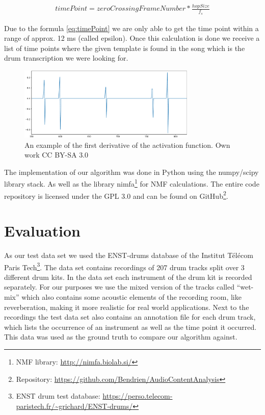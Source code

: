 \documentclass{article}
\begin{document}
\begin{align}
\label{eq:timePoint}
timePoint = zeroCrossingFrameNumber * \frac{hopSize}{f_s}
\end{align}

Due to the formula \ref{eq:timePoint} we are only able to get the time point within a range of approx. 12 ms (called epsilon).
Once this calculation is done we receive a list of time points where the given template is found in the song which is the drum transcription we were looking for.

\begin{figure}[htb]

\begin{minipage}[b]{1.0\linewidth}
  \centering
  \centerline{\includegraphics[width=8.5cm]{figures/Ableitung}}
  \medskip
\end{minipage}

\caption{An example of the first derivative of the activation function. \scriptsize{\textsf{\textcopyright} Own work CC BY-SA 3.0}}
\label{fig:Ableitung}

\end{figure}


The implementation of our algorithm was done in Python using the numpy/scipy library stack. 
As well as the library nimfa\footnote{NMF library: \url{http://nimfa.biolab.si/}} for NMF calculations.
The entire code repository is licensed under the GPL 3.0 and can be found on GitHub\footnote{Repository: \url{https://github.com/Bendrien/AudioContentAnalysis}}.




\section{Evaluation}
\label{sec:evaluation}

As our test data set we used the ENST-drums database of the Institut Télécom Paris Tech\footnote{ENST drum test database: \url{https://perso.telecom-paristech.fr/~grichard/ENST-drums/}}.
The data set contains recordings of 207 drum tracks split over 3 different drum kits.
In the data set each instrument of the drum kit is recorded separately.
For our purposes we use the mixed version of the tracks called ``wet-mix'' which also contains some acoustic elements of the recording room, like reverberation, making it more realistic for real world applications.
Next to the recordings the test data set also contains an annotation file for each drum track, which lists the occurrence of an instrument as well as the time point it occurred.
This data was used as the ground truth to compare our algorithm against.
\end{document}
